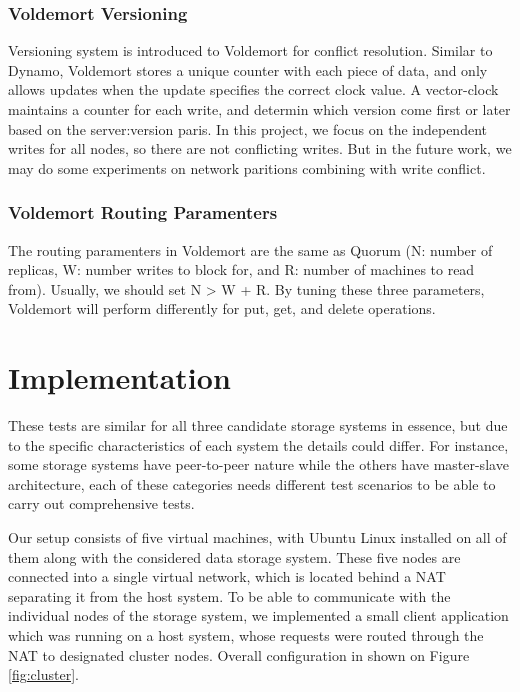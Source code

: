 \documentclass[a4paper]{article}
\begin{document}
\subsubsection{Voldemort Versioning}

Versioning system is introduced to Voldemort for conflict resolution. Similar to Dynamo, Voldemort stores a unique counter with each piece of data, and only allows updates when the update specifies the correct clock value\cite{dynamo}. A vector-clock maintains a counter for each write, and determin which version come first or later based on the server:version paris. In this project, we focus on the independent writes for all nodes, so there are not conflicting writes. But in the future work, we may do some experiments on network paritions combining with write conflict.

\subsubsection{Voldemort Routing Paramenters}

The routing paramenters in Voldemort are the same as Quorum (N: number of replicas, W: number writes to block for, and R: number of machines to read from). Usually, we should set N > W + R. By tuning these three parameters, Voldemort will perform differently for put, get, and delete operations. 

\section{Implementation}

These tests are similar for all three candidate storage systems in essence, but due to the specific characteristics of each system the details could differ. 
For instance, some storage systems have peer-to-peer nature while the others have master-slave architecture, each of these categories needs different test scenarios to be able to carry out comprehensive tests.

Our setup consists of five virtual machines, with Ubuntu Linux installed on all of them along with the considered data storage system. 
These five nodes are connected into a single virtual network, which is located behind a NAT separating it from the host system.
To be able to communicate with the individual nodes of the storage system, we implemented a small client application which was running on a host system, whose requests were routed through the NAT to designated cluster nodes. 
Overall configuration in shown on Figure \ref{fig:cluster}. 
\end{document}

